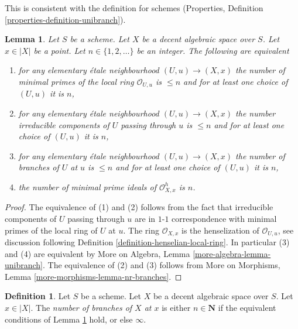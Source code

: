 \documentclass{stacks-project}
\theoremstyle{plain}
\newtheorem{lemma}[subsection]{Lemma}
\theoremstyle{definition}
\newtheorem{definition}[subsection]{Definition}
\theoremstyle{remark}
\numberwithin{equation}{subsection}
\begin{document}
\noindent
This is consistent with the definition for schemes
(Properties, Definition \ref{properties-definition-unibranch}).

\begin{lemma}
\label{lemma-nr-branches-local-ring}
Let $S$ be a scheme. Let $X$ be a decent algebraic space over $S$.
Let $x \in |X|$ be a point. Let $n \in \{1, 2, \ldots\}$ be an integer.
The following are equivalent
\begin{enumerate}
\item for any elementary \'etale neighbourhood $(U, u) \to (X, x)$
the number of minimal primes of the local ring $\mathcal{O}_{U, u}$
is $\leq n$ and for at least one choice of $(U, u)$ it is $n$,
\item for any elementary \'etale neighbourhood $(U, u) \to (X, x)$
the number irreducible components of $U$ passing through $u$ is $\leq n$
and for at least one choice of $(U, u)$ it is $n$,
\item for any elementary \'etale neighbourhood $(U, u) \to (X, x)$
the number of branches of $U$ at $u$ is $\leq n$
and for at least one choice of $(U, u)$ it is $n$,
\item the number of minimal prime ideals of
$\mathcal{O}_{X, x}^h$ is $n$.
\end{enumerate}
\end{lemma}

\begin{proof}
The equivalence of (1) and (2) follows from the fact that irreducible
components of $U$ passing through $u$ are in $1$-$1$ correspondence with
minimal primes of the local ring of $U$ at $u$.
The ring $\mathcal{O}_{X, x}$ is the henselization of $\mathcal{O}_{U, u}$, see
discussion following Definition \ref{definition-henselian-local-ring}.
In particular (3) and (4) are equivalent by
More on Algebra, Lemma \ref{more-algebra-lemma-unibranch}.
The equivalence of (2) and (3) follows from
More on Morphisms, Lemma \ref{more-morphisms-lemma-nr-branches}.
\end{proof}

\begin{definition}
\label{definition-number-of-branches}
Let $S$ be a scheme. Let $X$ be a decent algebraic space over $S$.
Let $x \in |X|$. The {\it number of branches of $X$ at $x$} is
either $n \in \mathbf{N}$ if the equivalent conditions
of Lemma \ref{lemma-nr-branches-local-ring}
hold, or else $\infty$.
\end{definition}
\end{document}
